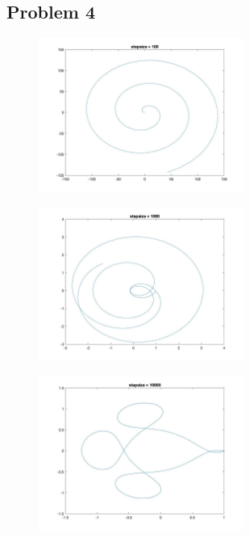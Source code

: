 \documentclass[11pt,fleqn]{exam}
\begin{document}
\subsection*{Problem 4}
\begin{figure}[H]
  	\centering
  	\includegraphics[width=0.6\textwidth]{q41.jpg}
\end{figure}	

\begin{figure}[H]
  	\centering
  	\includegraphics[width=0.6\textwidth]{q42.jpg}
\end{figure}	

\begin{figure}[H]
  	\centering
  	\includegraphics[width=0.6\textwidth]{q43.jpg}
\end{figure}	
\end{document}
